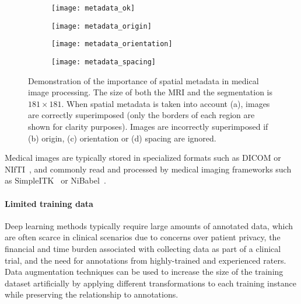 \begin{figure}
  \centering

  \begin{subfigure}{0.24\textwidth}
    \texttt{[image: metadata\_ok]}
    \caption{}
    \label{fig:meta_ok}
  \end{subfigure}
  \hfill
  \begin{subfigure}{0.24\textwidth}
    \texttt{[image: metadata\_origin]}
    \caption{}
    \label{fig:meta_origin}
  \end{subfigure}
  \hfill
  \begin{subfigure}{0.24\textwidth}
    \texttt{[image: metadata\_orientation]}
    \caption{}
    \label{fig:meta_orientation}
  \end{subfigure}
  \hfill
  \begin{subfigure}{0.24\textwidth}
    \texttt{[image: metadata\_spacing]}
    \caption{}
    \label{fig:meta_spacing}
  \end{subfigure}

  \caption{
    Demonstration of the importance of spatial metadata in medical image processing.
    The size of both the \ac{MRI} and the segmentation is $181 \times 181$.
    When spatial metadata is taken into account (a), images are correctly superimposed (only the borders of each region are shown for clarity purposes).
    Images are incorrectly superimposed if (b) origin, (c) orientation or (d) spacing are ignored.
  }
  \label{fig:metadata}
\end{figure}



Medical images are typically stored in specialized formats such as \ac{DICOM} or \ac{NIfTI}~\cite{larobina_medical_2014}, and commonly read and processed by medical imaging frameworks
such as SimpleITK~\cite{lowekamp_design_2013} or NiBabel~\cite{brett_nipynibabel_2020}.


\paragraph{Limited training data}

Deep learning methods typically require large amounts of annotated data, which are often scarce in clinical scenarios due to concerns over patient privacy, the financial and time burden associated with collecting data as part of a clinical trial, and the need for annotations from highly-trained and experienced raters.
Data augmentation techniques can be used to increase the size of the training dataset artificially by applying different transformations to each training instance while preserving the relationship to annotations.

